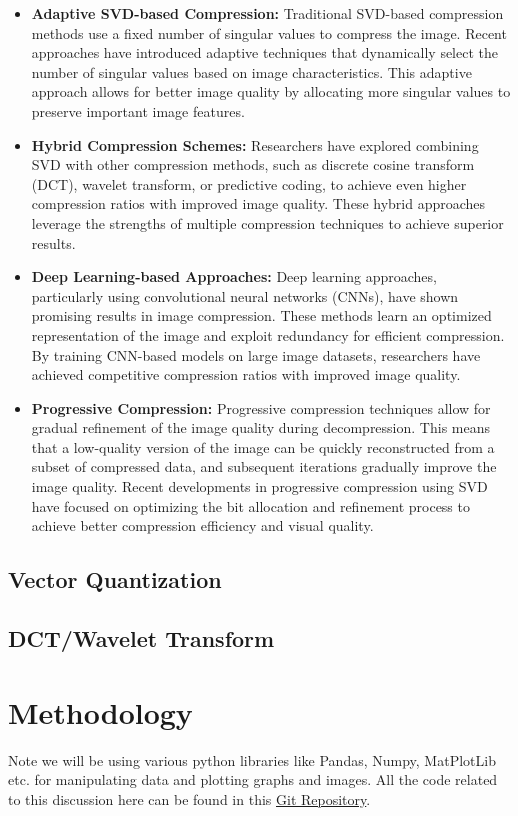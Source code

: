 \documentclass{article}
\begin{document}
\begin{itemize}
  \item {\textbf{Adaptive SVD-based Compression:} Traditional SVD-based compression methods use a fixed number of singular values to compress the image. Recent approaches have introduced adaptive techniques that dynamically select the number of singular values based on image characteristics. This adaptive approach allows for better image quality by allocating more singular values to preserve important image features.}
  \item {\textbf{Hybrid Compression Schemes:} Researchers have explored combining SVD with other compression methods, such as discrete cosine transform (DCT), wavelet transform, or predictive coding, to achieve even higher compression ratios with improved image quality. These hybrid approaches leverage the strengths of multiple compression techniques to achieve superior results.}
  \item {\textbf{Deep Learning-based Approaches:} Deep learning approaches, particularly using convolutional neural networks (CNNs), have shown promising results in image compression. These methods learn an optimized representation of the image and exploit redundancy for efficient compression. By training CNN-based models on large image datasets, researchers have achieved competitive compression ratios with improved image quality.}
  \item {\textbf{Progressive Compression:} Progressive compression techniques allow for gradual refinement of the image quality during decompression. This means that a low-quality version of the image can be quickly reconstructed from a subset of compressed data, and subsequent iterations gradually improve the image quality. Recent developments in progressive compression using SVD have focused on optimizing the bit allocation and refinement process to achieve better compression efficiency and visual quality.}
\end{itemize}

\subsection{Vector Quantization}

\subsection{DCT/Wavelet Transform}

\section{Methodology}
Note we will be using various python libraries like Pandas, Numpy, MatPlotLib etc. for manipulating data and plotting graphs and images. All the code related to this discussion here can be found in this \href{https://github.com/Vinit2244/LA-Project-25.git}{Git Repository}.
\end{document}

